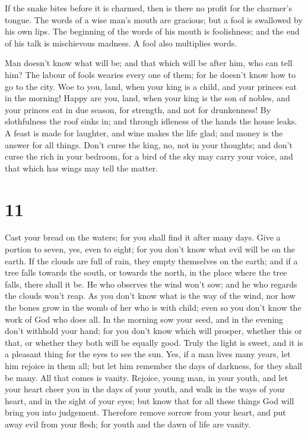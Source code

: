  If the snake bites before it is charmed, then is there no
profit for the charmer's tongue.  The words of a wise man's
mouth are gracious; but a fool is swallowed by his own lips.
 The beginning of the words of his mouth is foolishness;
and the end of his talk is mischievous madness.  A fool
also multiplies words.

Man doesn't know what will be; and that which will be after him, who can
tell him?  The labour of fools wearies every one of them;
for he doesn't know how to go to the city.  Woe to you,
land, when your king is a child, and your princes eat in the morning!
 Happy are you, land, when your king is the son of nobles,
and your princes eat in due season, for strength, and not for
drunkenness!  By slothfulness the roof sinks in; and
through idleness of the hands the house leaks.  A feast is
made for laughter, and wine makes the life glad; and money is the answer
for all things.  Don't curse the king, no, not in your
thoughts; and don't curse the rich in your bedroom, for a bird of the
sky may carry your voice, and that which has wings may tell the matter.

\hypertarget{section-10}{%
\section{11}\label{section-10}}

 Cast your bread on the waters; for you shall find it after
many days.  Give a portion to seven, yes, even to eight; for
you don't know what evil will be on the earth.  If the
clouds are full of rain, they empty themselves on the earth; and if a
tree falls towards the south, or towards the north, in the place where
the tree falls, there shall it be.  He who observes the wind
won't sow; and he who regards the clouds won't reap.  As you
don't know what is the way of the wind, nor how the bones grow in the
womb of her who is with child; even so you don't know the work of God
who does all.  In the morning sow your seed, and in the
evening don't withhold your hand; for you don't know which will prosper,
whether this or that, or whether they both will be equally good.
 Truly the light is sweet, and it is a pleasant thing for
the eyes to see the sun.  Yes, if a man lives many years,
let him rejoice in them all; but let him remember the days of darkness,
for they shall be many. All that comes is vanity.  Rejoice,
young man, in your youth, and let your heart cheer you in the days of
your youth, and walk in the ways of your heart, and in the sight of your
eyes; but know that for all these things God will bring you into
judgement.  Therefore remove sorrow from your heart, and
put away evil from your flesh; for youth and the dawn of life are
vanity.

